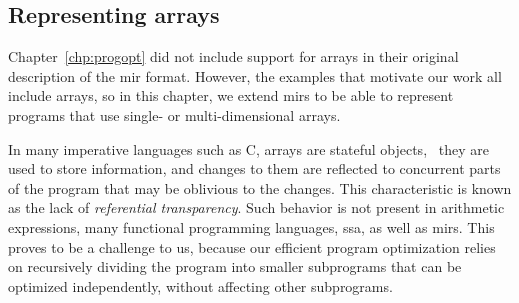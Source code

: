 

\subsection{Representing arrays}
\label{lo:sub:extending_the_translation_to_handle_arrays}

Chapter~\ref{chp:progopt} did not include support for arrays in their original
description of the \gls{mir} format. However, the examples that motivate our
work all include arrays, so in this chapter, we extend \glspl{mir} to be able
to represent programs that use single- or multi-dimensional arrays.

In many imperative languages such as C, arrays are stateful objects, \ie~they
are used to store information, and changes to them are reflected to concurrent
parts of the program that may be oblivious to the changes.  This characteristic
is known as the lack of \emph{referential transparency}.  Such behavior is
not present in arithmetic expressions, many functional programming languages,
\gls{ssa}, as well as \glspl{mir}.  This proves to be a challenge to us,
because our efficient program optimization relies on recursively dividing the
program into smaller subprograms that can be optimized independently, without
affecting other subprograms.

